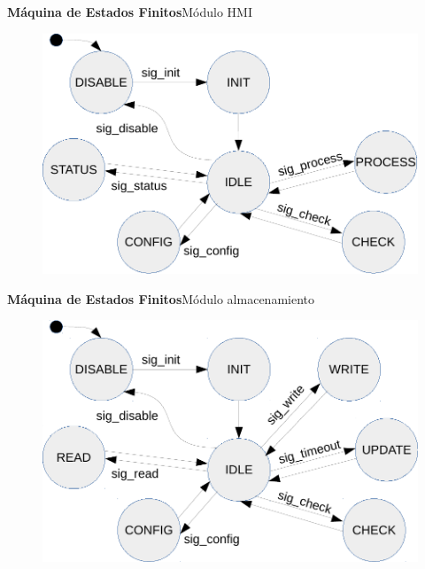 \documentclass[11pt, xcolor={table,xcdraw}]{beamer}
\begin{document}
\begin{frame}{\textbf{\LARGE{Máquina de Estados Finitos}}}{Módulo HMI}
	\vspace{-1.1cm}
	\begin{figure}[H]
		\includegraphics[height=.8\textheight]{./imagenes/MEF_HMI_2.pdf}
	\end{figure}	
\end{frame}

\begin{frame}{\textbf{\LARGE{Máquina de Estados Finitos}}}{Módulo almacenamiento}
	\vspace{-1.1cm}
	\begin{figure}[H]
		\includegraphics[height=.8\textheight]{./imagenes/MEF_sdCard_2.pdf}
	\end{figure}	
\end{frame}
\end{document}
